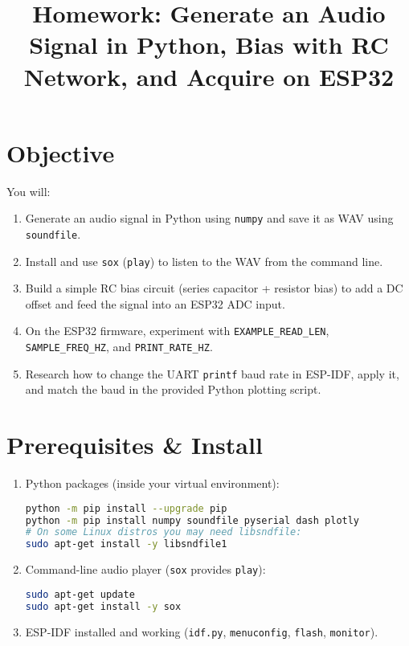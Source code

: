 \documentclass[11pt]{article}
\title{Homework: Generate an Audio Signal in Python, Bias with RC Network, and Acquire on ESP32}
\date{}
\begin{document}
\maketitle

\section*{Objective}
You will:
\begin{enumerate}[label=\alph*)]
  \item Generate an audio signal in Python using \texttt{numpy} and save it as WAV using \texttt{soundfile}.
  \item Install and use \texttt{sox} (\texttt{play}) to listen to the WAV from the command line.
  \item Build a simple RC bias circuit (series capacitor + resistor bias) to add a DC offset and feed the signal into an ESP32 ADC input.
  \item On the ESP32 firmware, experiment with \texttt{EXAMPLE\_READ\_LEN}, \texttt{SAMPLE\_FREQ\_HZ}, and \texttt{PRINT\_RATE\_HZ}.
  \item Research how to change the UART \texttt{printf} baud rate in ESP-IDF, apply it, and match the baud in the provided Python plotting script.
\end{enumerate}

\section*{Prerequisites \& Install}
\begin{enumerate}[label=\arabic*.]
  \item Python packages (inside your virtual environment):
\begin{lstlisting}[language=bash]
python -m pip install --upgrade pip
python -m pip install numpy soundfile pyserial dash plotly
# On some Linux distros you may need libsndfile:
sudo apt-get install -y libsndfile1
\end{lstlisting}

  \item Command-line audio player (\texttt{sox} provides \texttt{play}):
\begin{lstlisting}[language=bash]
sudo apt-get update
sudo apt-get install -y sox
\end{lstlisting}

  \item ESP-IDF installed and working (\texttt{idf.py}, \texttt{menuconfig}, \texttt{flash}, \texttt{monitor}).
\end{enumerate}
\end{document}
